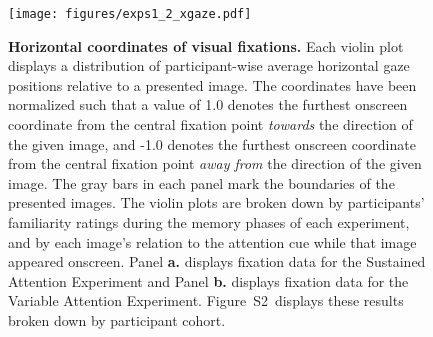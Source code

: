 \documentclass[english]{article}
\newcommand{\fixation}{S2}
\begin{document}
\begin{figure}[tp]
  \centering
  \texttt{[image: figures/exps1\_2\_xgaze.pdf]}
  \caption{\textbf{Horizontal coordinates of visual fixations.}  Each violin plot displays a distribution of participant-wise average horizontal gaze positions relative to a presented image.  The coordinates have been normalized such that a value of 1.0 denotes the furthest onscreen coordinate from the central fixation point \textit{towards} the direction of the given image, and -1.0 denotes the furthest onscreen coordinate from the central fixation point \textit{away from} the direction of the given image.  The gray bars in each panel mark the boundaries of the presented images.  The violin plots are broken down by participants' familiarity ratings during the memory phases of each experiment, and by each image's relation to the attention cue while that image appeared onscreen.  Panel \textbf{a.} displays fixation data for the Sustained Attention Experiment and Panel \textbf{b.} displays fixation data for the Variable Attention Experiment.  Figure~\fixation~displays these results broken down by participant cohort.}
\label{fig:fixation}
\end{figure}
\end{document}
